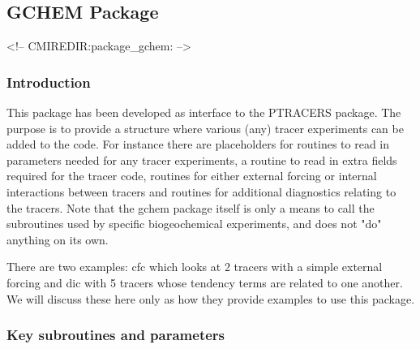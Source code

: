 \subsection {GCHEM Package} 
\label{sec:pkg:gchem}
\begin{rawhtml}
<!-- CMIREDIR:package_gchem: -->
\end{rawhtml}

\subsubsection {Introduction}
This package has been developed as interface to the PTRACERS package.
The purpose is to provide a structure where various (any)
tracer experiments can be added to the code.
For instance there are placeholders for routines
to read in parameters needed for any tracer experiments, a routine
to read in extra fields required for the tracer code, routines
for either external forcing or internal interactions between tracers
and routines for additional diagnostics relating to the tracers.
Note that the gchem package itself is only a means to call
the subroutines used by specific biogeochemical experiments,
and does not "do" anything on its own.

There are two examples: cfc which looks at 2 tracers with a
simple external forcing and dic with 5 tracers whose tendency terms
are related to one another. We will discuss these here only as
how they provide examples to use this package.


\subsubsection {Key subroutines and parameters}

